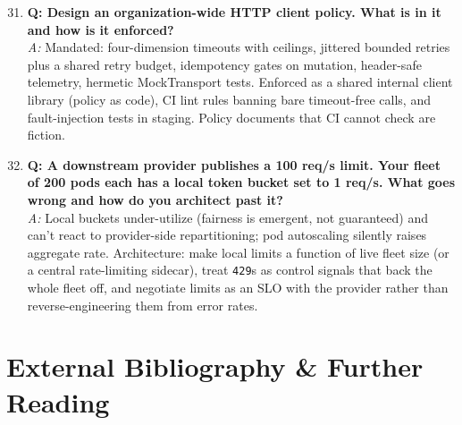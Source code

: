 \begin{enumerate}
  \setcounter{enumi}{30}
  \item \textbf{Q: Design an organization-wide HTTP client policy. What is in
        it and how is it enforced?}\\
        \textit{A:} Mandated: four-dimension timeouts with ceilings, jittered
        bounded retries plus a shared retry budget, idempotency gates on
        mutation, header-safe telemetry, hermetic MockTransport tests.
        Enforced as a shared internal client library (policy as code), CI
        lint rules banning bare timeout-free calls, and fault-injection tests
        in staging. Policy documents that CI cannot check are fiction.

  \item \textbf{Q: A downstream provider publishes a 100 req/s limit. Your
        fleet of 200 pods each has a local token bucket set to 1 req/s.
        What goes wrong and how do you architect past it?}\\
        \textit{A:} Local buckets under-utilize (fairness is emergent, not
        guaranteed) and can't react to provider-side repartitioning; pod
        autoscaling silently raises aggregate rate. Architecture: make local
        limits a function of live fleet size (or a central rate-limiting
        sidecar), treat \texttt{429}s as control signals that back the whole
        fleet off, and negotiate limits as an SLO with the provider rather
        than reverse-engineering them from error rates.
\end{enumerate}


\section{External Bibliography \& Further Reading}
\label{sec:ch02-bibliography}

